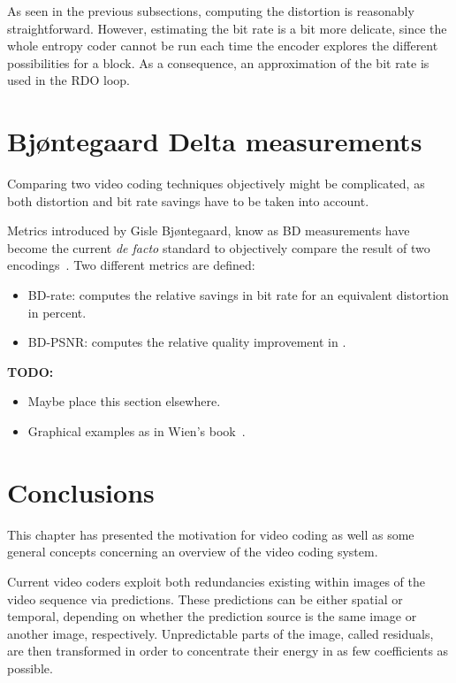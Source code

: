 \documentclass[11pt,a4paper,openright,twoside]{book}
\providecommand{\todo}[1]{
	\begin{center}
		\colorbox{almostwhite}{
			\begin{minipage}{0.85\linewidth}
				\textbf{TODO:} #1
			\end{minipage}
		}
	\end{center}
}
\numberwithin{equation}{section} %
\begin{document}
As seen in the previous subsections, computing the distortion is
reasonably straightforward.
However, estimating the bit rate is a bit more delicate, since the whole
entropy coder cannot be run each time the encoder explores the different
possibilities for a block.
As a consequence, an approximation of the bit rate is used in the
\ac{RDO} loop.

\section{Bj{\o}ntegaard Delta measurements}
\label{sub:bjontegaard_delta_measurements}

Comparing two video coding techniques objectively might be complicated,
as both distortion and bit rate savings have to be taken into account.

Metrics introduced by Gisle Bj{\o}ntegaard, know as \ac{BD} measurements
have become the current \emph{de facto} standard to objectively compare
the result of two encodings~\cite{VCEG-M33,VCEG-AI11}.
Two different metrics are defined:
\begin{itemize}
	\item \ac{BD}-rate: computes the relative savings in bit rate for an
		equivalent distortion in percent.
	\item \ac{BD}-\ac{PSNR}: computes the relative quality improvement
		in \deci\bel.
\end{itemize}

\todo{
\begin{itemize}
	\item Maybe place this section elsewhere.
	\item Graphical examples as in Wien's book~\cite{wien-15-hevc}.
\end{itemize}
}

\section{Conclusions}
\label{sec:conclusions_video_coding}

This chapter has presented the motivation for video coding as well as
some general concepts concerning an
overview of the video coding system.

Current video coders exploit both redundancies existing within images of
the video sequence via predictions.
These predictions can be either spatial or temporal, depending on
whether the prediction source is the same image or another image,
respectively.
Unpredictable parts of the image, called residuals, are then transformed
in order to concentrate their energy in as few coefficients as possible.
\end{document}
